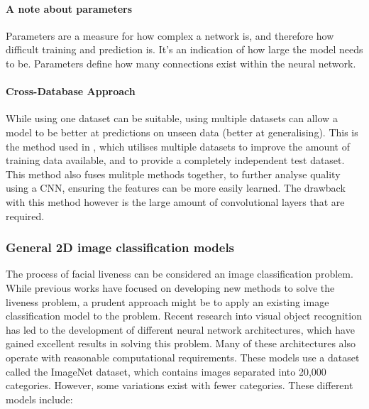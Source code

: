 \documentclass[10pt,a4paper]{article}
\begin{document}
        \paragraph{A note about parameters}
        Parameters are a measure for how complex a network is, and therefore how difficult training and prediction is. It's an indication of how large the model needs to be. Parameters define how many connections exist within the neural network.

        \paragraph{Cross-Database Approach}
        While using one dataset can be suitable, using multiple datasets can allow a model to be better at predictions on unseen data (better at generalising). This is the method used in \cite{Patel2016CrossDatabaseFA}, which utilises multiple datasets to improve the amount of training data available, and to provide a completely independent test dataset.
        This method also fuses mulitple methods together, to further analyse quality using a CNN, ensuring the features can be
        more easily learned. The drawback with this method however is the large amount of convolutional layers that are required. 
        
        \subsubsection{General 2D image classification models}
        The process of facial liveness can be considered an image classification problem. 
        While previous works have focused on developing new methods to solve the liveness problem, a prudent approach might be to apply an existing image classification model to the problem. 
        Recent research into visual object recognition has led to the development of different neural network architectures, which have gained excellent results in solving this problem.
        Many of these architectures also operate with reasonable computational requirements.
        These models use a dataset called the ImageNet dataset, which contains images separated into 20,000 categories. However, some variations exist with fewer categories.
        These different models include:
            
\end{document}
